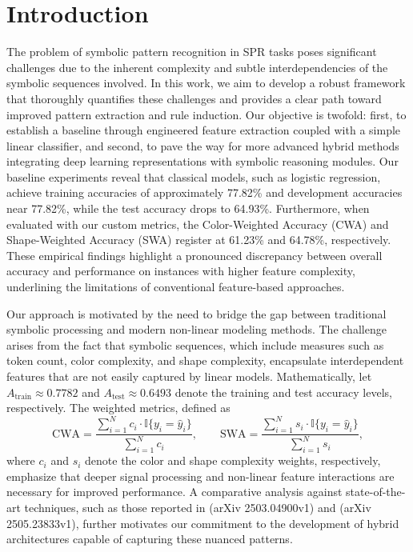 \documentclass{article}
\begin{document}
\section{Introduction}
The problem of symbolic pattern recognition in SPR tasks poses significant challenges due to the inherent complexity and subtle interdependencies of the symbolic sequences involved. In this work, we aim to develop a robust framework that thoroughly quantifies these challenges and provides a clear path toward improved pattern extraction and rule induction. Our objective is twofold: first, to establish a baseline through engineered feature extraction coupled with a simple linear classifier, and second, to pave the way for more advanced hybrid methods integrating deep learning representations with symbolic reasoning modules. Our baseline experiments reveal that classical models, such as logistic regression, achieve training accuracies of approximately 77.82\% and development accuracies near 77.82\%, while the test accuracy drops to 64.93\%. Furthermore, when evaluated with our custom metrics, the Color-Weighted Accuracy (CWA) and Shape-Weighted Accuracy (SWA) register at 61.23\% and 64.78\%, respectively. These empirical findings highlight a pronounced discrepancy between overall accuracy and performance on instances with higher feature complexity, underlining the limitations of conventional feature-based approaches.

Our approach is motivated by the need to bridge the gap between traditional symbolic processing and modern non-linear modeling methods. The challenge arises from the fact that symbolic sequences, which include measures such as token count, color complexity, and shape complexity, encapsulate interdependent features that are not easily captured by linear models. Mathematically, let \( A_{\text{train}} \approx 0.7782 \) and \( A_{\text{test}} \approx 0.6493 \) denote the training and test accuracy levels, respectively. The weighted metrics, defined as 
\[
\text{CWA} = \frac{\sum_{i=1}^{N} c_i \cdot \mathbb{I}\{y_i = \hat{y}_i\}}{\sum_{i=1}^{N} c_i}, \qquad \text{SWA} = \frac{\sum_{i=1}^{N} s_i \cdot \mathbb{I}\{y_i = \hat{y}_i\}}{\sum_{i=1}^{N} s_i},
\]
where \( c_i \) and \( s_i \) denote the color and shape complexity weights, respectively, emphasize that deeper signal processing and non-linear feature interactions are necessary for improved performance. A comparative analysis against state-of-the-art techniques, such as those reported in (arXiv 2503.04900v1) and (arXiv 2505.23833v1), further motivates our commitment to the development of hybrid architectures capable of capturing these nuanced patterns.
\end{document}
